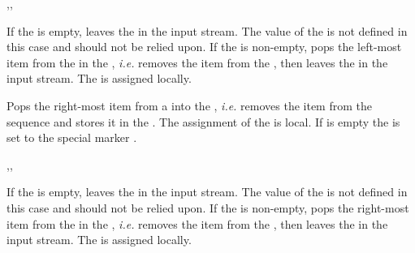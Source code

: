 \documentclass[oneside]{book}
\begin{document}
\begin{function}{\seqPopLeftT,\seqPopLeftF,\seqPopLeftTF}
\begin{syntax}
   
   
    
\end{syntax}
If the  is empty, leaves the  in the
input stream.  The value of the  is
not defined in this case and should not be relied upon.  If the
 is non-empty, pops the left-most item from the 
in the , \emph{i.e.} removes the item from the
, then leaves the  in the input stream.
The  is assigned locally.
\begin{demohigh}
\seqPopLeftTF \cEmptySeq {} {}
\end{demohigh}
\end{function}

\begin{function}{\seqPopRight}
\begin{syntax}
  
\end{syntax}
Pops the right-most item from a  into the
, \emph{i.e.} removes the item from the
sequence and stores it in the .
The assignment of the  is local.
If  is empty the 
is set to the special marker .
\begin{demohigh}
\seqSetFromClist {}
\seqPopRight \lTmpaSeq \lTmpaTl
\seqVarJoin \lTmpaSeq {,}
\end{demohigh}
\end{function}

\begin{function}{\seqPopRightT,\seqPopRightF,\seqPopRightTF}
\begin{syntax}
   
   
    
\end{syntax}
If the  is empty, leaves the  in the
input stream.  The value of the  is
not defined in this case and should not be relied upon.  If the
 is non-empty, pops the right-most item from the 
in the , \emph{i.e.} removes the item from the
, then leaves the  in the input stream.
The  is assigned locally.
\begin{demohigh}
\seqPopRightTF \cEmptySeq {} {}
\end{demohigh}
\end{function}
\end{document}
